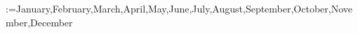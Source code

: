 \documentclass{article}
\begin{document}
\@for\month:={January,February,March,April,May,June,July,August,September,October,November,December} 

\makeatother



\end{document}
